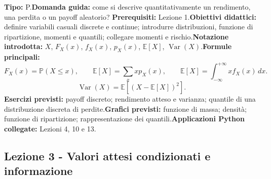 \documentclass[12pt,a4paper]{article}%
\newcommand{\1}{\mathbf{1}}
\begin{document}
\textbf{Tipo:} P.\newline\textbf{Domanda guida:} come si descrive
quantitativamente un rendimento, una perdita o un payoff aleatorio?\newline%
\textbf{Prerequisiti:} Lezione 1.\newline\textbf{Obiettivi didattici:}
definire variabili casuali discrete e continue; introdurre distribuzioni,
funzione di ripartizione, momenti e quantili; collegare momenti e
rischio.\newline\textbf{Notazione introdotta:} $X$, $F_{X}(x)$, $f_{X}(x)$,
$p_{X}(x)$, $\mathbb{E}[X]$, $\operatorname{Var}(X)$.\newline\textbf{Formule
principali:}
\[
F_{X}(x)=\mathbb{P}(X\leq x), \qquad\mathbb{E}[X]=\sum_{x} x p_{X}(x),
\qquad\mathbb{E}[X]=\int_{-\infty}^{+\infty}x f_{X}(x)\,dx.
\]
\[
\operatorname{Var}(X)=\mathbb{E}[(X-\mathbb{E}[X])^{2}].
\]
\textbf{Esercizi previsti:} payoff discreto; rendimento atteso e varianza;
quantile di una distribuzione discreta di perdite.\newline\textbf{Grafici
previsti:} funzione di massa; densit\`{a}; funzione di ripartizione;
rappresentazione dei quantili.\newline\textbf{Applicazioni Python collegate:}
Lezioni 4, 10 e 13.

\subsection{Lezione 3 - Valori attesi condizionati e informazione}
\end{document}
